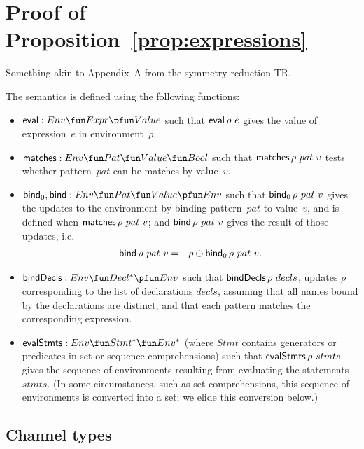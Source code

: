 \section{Proof of Proposition~\ref{prop:expressions}}
\label{sec:proof}

Something akin to Appendix~A from the symmetry reduction TR.

The semantics is defined using the following functions:
%
\begin{itemize}
\item $\eval : Env \fun Expr \pfun Value$ such that $\mathop{\sf eval} \rho~e$ gives the
  value of expression~$e$ in environment~$\rho$.

\item $\matches : Env \fun Pat \fun Value \fun Bool$ such that
  $\mathop{\sf matches} \rho~pat ~ v$ tests whether pattern~$pat$ can be matches by
  value~$v$.

\item $\bind_0, \bind : Env \fun Pat \fun Value \pfun Env$ such that
  $\mathop{\sf bind}\nolimits_0 \rho~pat~v$ gives the updates to the environment by binding
  pattern~$pat$ to value~$v$, and is defined when $\mathop{\sf matches} \rho~ pat~v$; and 
  $\mathop{\sf bind}\nolimits \rho~pat~v$ gives the result of those updates, i.e.
  \begin{eqnarray*}
  \mathop{\sf bind}\nolimits \rho~pat~v & = & \rho \oplus \mathop{\sf bind}\nolimits_0 \rho~pat~v.
  \end{eqnarray*}

\item $\bindDecls : Env \fun Decl^* \pfun Env$ such that
  $\mathop{\sf bindDecls} \rho~decls$, updates $\rho$ corresponding to the list of
  declarations $decls$, assuming that all names bound by the declarations are
  distinct, and that each pattern matches the corresponding expression.

\item $\evalStmts : Env \fun Stmt^* \fun Env^*$ (where $Stmt$ contains
  generators or predicates in set or sequence comprehensions) such that
  $\mathop{\sf evalStmts} \rho~stmts$ gives the sequence of environments resulting from
  evaluating the statements~$stmts$.  (In some circumstances, such as set
  comprehensions, this sequence of environments is converted into a set; we
  elide this conversion below.)
\end{itemize}


\subsection{Channel types}

